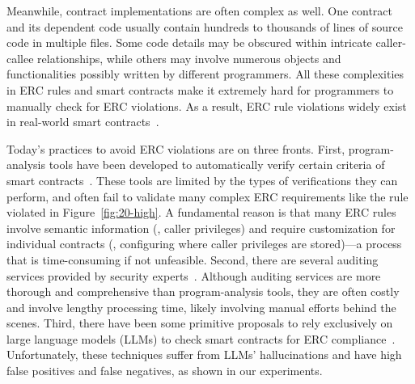 Meanwhile, contract implementations are often complex as well. 
One contract and its dependent code
usually contain hundreds to thousands of lines of source code in multiple files.
Some code details may be obscured within intricate 
caller-callee relationships, while others may involve numerous 
objects and functionalities possibly written by different 
programmers. All these complexities in ERC rules and smart 
contracts make it extremely hard for programmers to manually 
check for ERC violations. As a result,
ERC rule violations widely exist in real-world smart contracts~\cite{humanaudited}.


Today's practices to avoid ERC violations are on three fronts. 
First, program-analysis tools have been developed to 
automatically verify certain criteria of smart contracts~\cite{slither-erc,erc20-verifier,ZepScope,VerX,ERCx}. 
These tools are limited by the types of verifications they can perform, 
and often fail to validate many complex ERC requirements like the rule 
violated in Figure~\ref{fig:20-high}.
A fundamental reason 
is that many 
ERC rules involve semantic information (\eg, caller privileges) 
and require customization for individual contracts (\eg, configuring where
caller privileges are stored)---a process that is time-consuming if 
not unfeasible. 
Second, there are several auditing services 
provided by security 
experts~\cite{certik,revoluzion,pixelplex,blockhunters, immunebytes, antier,humanaudited}.
Although auditing services are more thorough and 
comprehensive than program-analysis tools, 
they are often costly and involve lengthy processing time, likely involving manual efforts behind the scenes.
Third, there have been some primitive proposals to rely exclusively on large language models (LLMs) to check 
smart contracts for ERC compliance~\cite{GPT-RyanHarvey,GPT-MichaelDNorman}.
Unfortunately, these techniques suffer from LLMs’ hallucinations and have high false positives and false negatives, as shown in our
experiments.







